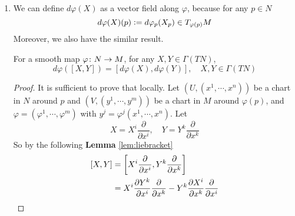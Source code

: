 \begin{enumerate}[label=\Roman{*}.]
	\begin{proof}
		For any $g \in C^\infty(M)$,
		\begin{equation*}
			\begin{aligned}
				[X,Y](g\circ \varphi) &= XY(g \circ \varphi) - YX(g \circ \varphi) \\
				&= X\bc{(\bar{Y}g)\circ \varphi} - Y\bc{(\bar{X}g)\circ \varphi} \\
				&= (\bar{X}\bar{Y}g)\circ \varphi - (\bar{Y}\bar{X}g)\circ \varphi \\
				&= ([\bar{X},\bar{Y}]g) \circ \varphi
			\end{aligned}
		\end{equation*}
		Then it can get by above lemma.
	\end{proof}

	\item We can define $d\varphi(X)$ as a vector field along $\varphi$, because for any $p \in N$
	\begin{equation*}
		d\varphi(X)(p) \vcentcolon= d\varphi_p(X_p) \in T_{\varphi(p)}M
	\end{equation*}
	Moreover, we also have the similar result.
	\begin{lem}\label{lem:lieforinduce}
		For a smooth map $\varphi \colon N \rightarrow M$, for any $X,Y \in \Gamma(TN)$,
		\begin{equation*}
			d\varphi([X,Y]) = [d\varphi(X),d\varphi(Y)],\quad X,Y \in \Gamma(TN)
		\end{equation*}
	\end{lem}
	\begin{proof}
		It is sufficient to prove that locally. Let $(U,(x^1,\cdots,x^n))$ be a chart in $N$ around $p$ and $(V,(y^1,\cdots,y^m))$ be a chart in $M$ around $\varphi(p)$, and $\varphi = (\varphi^1,\cdots,\varphi^m)$ with $y^j = \varphi^j(x^1,\cdots,x^n)$. Let
		\begin{equation*}
			X=X^i\frac{\partial}{\partial x^i},\quad Y = Y^k\frac{\partial}{\partial x^k}
		\end{equation*}
		So by the following \textbf{Lemma} \ref{lem:liebracket}
		\begin{equation*}
			\begin{aligned}
				[X,Y] &= \bj{X^i\frac{\partial}{\partial x^i},Y^k\frac{\partial}{\partial x^k}} \\
				&= X^i\frac{\partial Y^k}{\partial x^i}\frac{\partial}{\partial x^k} - Y^k\frac{\partial X^i}{\partial x^k}\frac{\partial}{\partial x^i}
			\end{aligned}
		\end{equation*}

\end{proof}
\end{enumerate}
